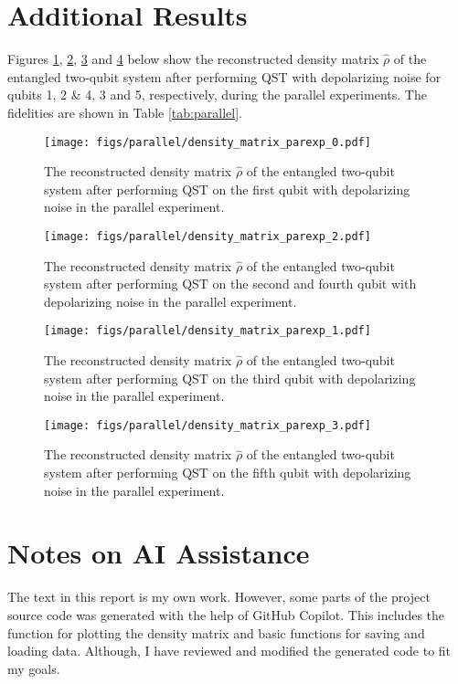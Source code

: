 \documentclass[a4paper,12pt]{article}
\begin{document}
\newpage
\printbibliography

\newpage
\appendix
{}
\setcounter{page}{1}
\section{Additional Results} \label{A}
Figures \ref{fig:q1}, \ref{fig:q3}, \ref{fig:q2} and \ref{fig:q4} below show the reconstructed density matrix $\hat{\rho}$ of the entangled two-qubit system after performing QST with depolarizing noise for qubits 1, 2 \& 4, 3 and 5, respectively, during the parallel experiments. The fidelities are shown in Table \ref{tab:parallel}.
\begin{figure}[H]
    \centering
    \texttt{[image: figs/parallel/density\_matrix\_parexp\_0.pdf]}
    \caption{The reconstructed density matrix $\hat{\rho}$ of the entangled two-qubit system after performing QST on the first qubit with depolarizing noise in the parallel experiment.}
    \label{fig:q1}
\end{figure}

\begin{figure}[H]
    \centering
    \texttt{[image: figs/parallel/density\_matrix\_parexp\_2.pdf]}
    \caption{The reconstructed density matrix $\hat{\rho}$ of the entangled two-qubit system after performing QST on the second and fourth qubit with depolarizing noise in the parallel experiment.}
    \label{fig:q3}
\end{figure}

\begin{figure}[H]
    \centering
    \texttt{[image: figs/parallel/density\_matrix\_parexp\_1.pdf]}
    \caption{The reconstructed density matrix $\hat{\rho}$ of the entangled two-qubit system after performing QST on the third qubit with depolarizing noise in the parallel experiment.}
    \label{fig:q2}
\end{figure}

\begin{figure}[H]
    \centering
    \texttt{[image: figs/parallel/density\_matrix\_parexp\_3.pdf]}
    \caption{The reconstructed density matrix $\hat{\rho}$ of the entangled two-qubit system after performing QST on the fifth qubit with depolarizing noise in the parallel experiment.}
    \label{fig:q4}
\end{figure}

\section{Notes on AI Assistance}
The text in this report is my own work. However, some parts of the project source code was generated with the help of GitHub Copilot. This includes the function for plotting the density matrix and basic functions for saving and loading data. Although, I have reviewed and modified the generated code to fit my goals.
\end{document}
